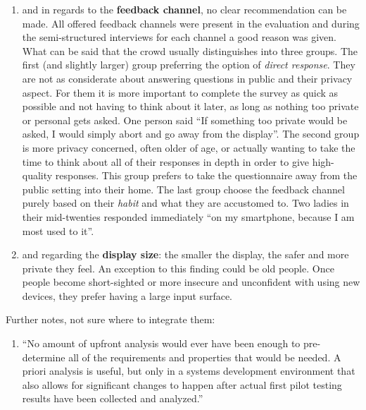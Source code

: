 \begin{enumerate}
	\item and in regards to the \textbf{feedback channel}, no clear recommendation can be made. All offered feedback channels were present in the evaluation and during the semi-structured interviews for each channel a good reason was given. What can be said that the crowd usually distinguishes into three groups. The first (and slightly larger) group preferring the option of \textit{direct response}. They are not as considerate about answering questions in public and their privacy aspect. For them it is more important to complete the survey as quick as possible and not having to think about it later, as long as nothing too private or personal gets asked. One person said ``If something too private would be asked, I would simply abort and go away from the display''. The second group is more privacy concerned, often older of age, or actually wanting to take the time to think about all of their responses in depth in order to give high-quality responses. This group prefers to take the questionnaire away from the public setting into their home. The last group choose the feedback channel purely based on their \textit{habit} and what they are accustomed to. Two ladies in their mid-twenties responded immediately ``on my smartphone, because I am most used to it''.

	\item and regarding the \textbf{display size}: the smaller the display, the safer and more private they feel. An exception to this finding could be old people. Once people become short-sighted or more insecure and unconfident with using new devices, they prefer having a large input surface.

	\end{enumerate}


	Further notes, not sure where to integrate them:
	\begin{enumerate}
	\item ``No amount of upfront analysis would ever have been enough to pre- determine all of the requirements and properties that would be needed. A priori analysis is useful, but only in a systems development environment that also allows for significant changes to happen after actual first pilot testing results have been collected and analyzed.'' \cite{russell2004use}
	\end{enumerate}










